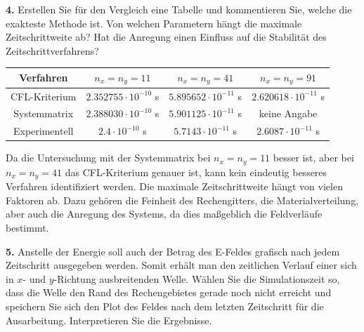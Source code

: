 \documentclass[Protokollheft.tex]{subfiles}
\begin{document}
\begin{framed}
	\noindent \textbf{4.} Erstellen Sie für den Vergleich eine Tabelle und kommentieren Sie, welche die exakteste Methode ist. Von welchen Parametern hängt die maximale Zeitschrittweite ab? Hat die Anregung einen Einfluss auf die Stabilität des Zeitschrittverfahrens?\label{exer:compareMethods4deltaTmax}
\end{framed}
\noindent
\begin{center}
\begin{tabular}{|c|c|c|c|}
	\hline
	  Verfahren & $n_x=n_y =11$ & $n_x=n_y =41$ & $n_x=n_y =91$ \\
	\hline
	CFL-Kriterium & $2.352755\cdot 10^{-10}$ s & $5.895652 \cdot 10^{-11}$ s & $ 2.620618\cdot 10^{-11}$ s\\
	\hline
	Systemmatrix & $2.388030 \cdot 10^{-10}$ s & $5.901125\cdot 10^{-11} $ s & keine Angabe\\
	\hline
	Experimentell & $2.4\cdot 10^{-10}$ s & $5.7143\cdot 10^{-11}$ s & $2.6087\cdot 10^{-11}$ s\\
	\hline
\end{tabular}
\end{center}
Da die Untersuchung mit der Systemmatrix bei $n_x=n_y =11$ besser ist, aber bei $n_x=n_y =41$ das CFL-Kriterium genauer ist, kann kein eindeutig besseres Verfahren identifiziert werden. Die maximale Zeitschrittweite hängt von vielen Faktoren ab. Dazu gehören die Feinheit des Rechengitters, die Materialverteilung, aber auch die Anregung des Systems, da dies maßgeblich die Feldverläufe bestimmt.


\begin{framed}
	\noindent \textbf{5.} Anstelle der Energie soll auch der Betrag des E-Feldes grafisch nach jedem Zeitschritt ausgegeben werden.
Somit erhält man den zeitlichen Verlauf einer sich in $x$- und $y$-Richtung
ausbreitenden Welle. Wählen Sie die Simulationszeit so, dass die Welle den Rand des Rechengebietes gerade noch nicht erreicht und speichern Sie sich den Plot des Feldes nach dem letzten Zeitschritt für die Ausarbeitung. Interpretieren Sie die Ergebnisse.\label{exer:visualizeWave}
\end{framed}
\end{document}
